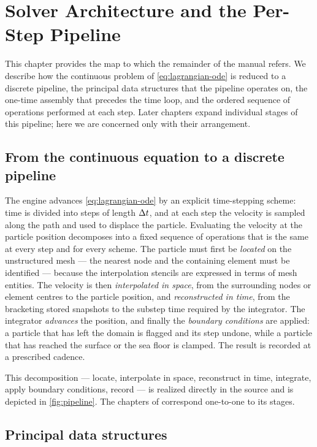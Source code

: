 \chapter{Solver Architecture and the Per-Step Pipeline}\label{ch:arch}

This chapter provides the map to which the remainder of the manual refers. We
describe how the continuous problem of \cref{eq:lagrangian-ode} is reduced to a
discrete pipeline, the principal data structures that the pipeline operates on,
the one-time assembly that precedes the time loop, and the ordered sequence of
operations performed at each step. Later chapters expand individual stages of this
pipeline; here we are concerned only with their arrangement.

\section{From the continuous equation to a discrete pipeline}\label{sec:arch-pipeline}

The engine advances \cref{eq:lagrangian-ode} by an explicit time-stepping scheme:
time is divided into steps of length $\Delta t$, and at each step the velocity is
sampled along the path and used to displace the particle. Evaluating the velocity
at the particle position decomposes into a fixed sequence of operations that is
the same at every step and for every scheme. The particle must first be
\emph{located} on the unstructured mesh --- the nearest node and the containing
element must be identified --- because the interpolation stencils are expressed
in terms of mesh entities. The velocity is then \emph{interpolated in space}, from
the surrounding nodes or element centres to the particle position, and
\emph{reconstructed in time}, from the bracketing stored snapshots to the substep
time required by the integrator. The integrator \emph{advances} the position, and
finally the \emph{boundary conditions} are applied: a particle that has left the
domain is flagged and its step undone, while a particle that has reached the
surface or the sea floor is clamped. The result is recorded at a prescribed
cadence.

This decomposition --- locate, interpolate in space, reconstruct in time,
integrate, apply boundary conditions, record --- is realized directly in the
source and is depicted in \cref{fig:pipeline}. The chapters of
 correspond one-to-one to its stages.

\section{Principal data structures}\label{sec:arch-data}

